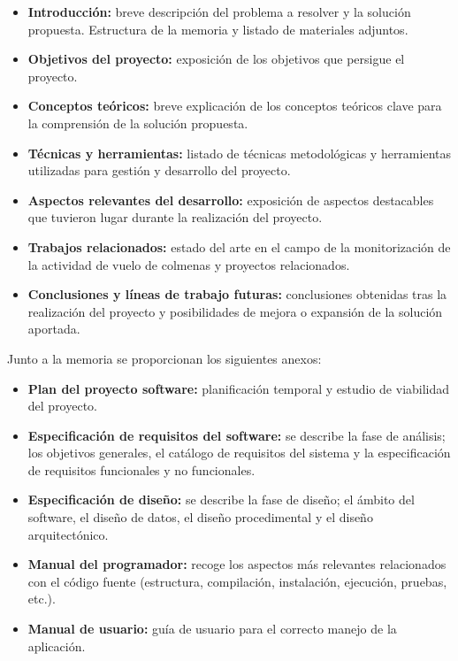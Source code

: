 \begin{itemize}
\tightlist
\item
  \textbf{Introducción:} breve descripción del problema a resolver y la
  solución propuesta. Estructura de la memoria y listado de materiales
  adjuntos.
\item
  \textbf{Objetivos del proyecto:} exposición de los objetivos que
  persigue el proyecto.
\item
  \textbf{Conceptos teóricos:} breve explicación de los conceptos
  teóricos clave para la comprensión de la solución propuesta.
\item
  \textbf{Técnicas y herramientas:} listado de técnicas metodológicas y
  herramientas utilizadas para gestión y desarrollo del proyecto.
\item
  \textbf{Aspectos relevantes del desarrollo:} exposición de aspectos
  destacables que tuvieron lugar durante la realización del proyecto.
\item
  \textbf{Trabajos relacionados:} estado del arte en el campo de la
  monitorización de la actividad de vuelo de colmenas y proyectos
  relacionados.
\item
  \textbf{Conclusiones y líneas de trabajo futuras:} conclusiones
  obtenidas tras la realización del proyecto y posibilidades de mejora o
  expansión de la solución aportada.
\end{itemize}

Junto a la memoria se proporcionan los siguientes anexos:

\begin{itemize}
\tightlist
\item
  \textbf{Plan del proyecto software:} planificación temporal y estudio
  de viabilidad del proyecto.
\item
  \textbf{Especificación de requisitos del software:} se describe la
  fase de análisis; los objetivos generales, el catálogo de requisitos
  del sistema y la especificación de requisitos funcionales y no
  funcionales.
\item
  \textbf{Especificación de diseño:} se describe la fase de diseño; el
  ámbito del software, el diseño de datos, el diseño procedimental y el
  diseño arquitectónico.
\item
  \textbf{Manual del programador:} recoge los aspectos más relevantes
  relacionados con el código fuente (estructura, compilación,
  instalación, ejecución, pruebas, etc.).
\item
  \textbf{Manual de usuario:} guía de usuario para el correcto manejo de
  la aplicación.
\end{itemize}

